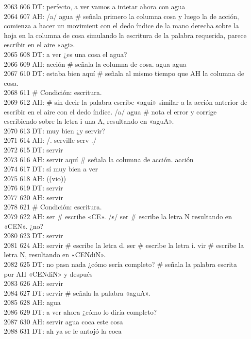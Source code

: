 2063 606 DT: perfecto, a ver vamos a intetar ahora con agua\\
2064 607 AH: /a/ agua # señala primero la columna cosa y luego la de acción, comienza a hacer un movimient con el dedo índice de la mano derecha sobre la hoja en la columna de cosa simulando la escritura de la palabra requerida, parece escribir en el aire «agi».\\
2065 608 DT: a ver ¿es una cosa el agua?\\
2066 609 AH: acción # señala la columna de cosa. agua agua\\
2067 610 DT: estaba bien aquí # señala al mismo tiempo que AH la columna de cosa.\\
2068 611 # Condición: escritura.\\
2069 612 AH: # sin decir la palabra escribe «agui» similar a la acción anterior de escribir en el aire con el dedo índice. /a/ agua # nota el error y corrige escribiendo sobre la letra i una A, resultando en «aguA».\\
2070 613 DT: muy bien ¿y servir?\\
2071 614 AH: /. serville serv ./ \\
2072 615 DT: servir\\
2073 616 AH: servir aquí # señala la columna de acción. acción\\
2074 617 DT: sí muy bien a ver\\
2075 618 AH: ((vio))\\
2076 619 DT: servir\\
2077 620 AH: servir\\
2078 621 # Condición: escritura.\\
2079 622 AH: ser # escribe «CE». /s/ ser # escribe la letra N resultando en «CEN». ¿no?\\
2080 623 DT: servir\\
2081 624 AH: servir # escribe la letra d. ser # escribe la letra i. vir # escribe la letra N, resultando en «CENdiN».\\
2082 625 DT: no pasa nada ¿cómo sería completo? # señala la palabra escrita por AH «CENdiN» y después\\
2083 626 AH: servir\\
2084 627 DT: servir # señala la palabra «aguA».\\
2085 628 AH: agua\\
2086 629 DT: a ver ahora ¿cómo lo diría completo?\\
2087 630 AH: servir agua coca este cosa\\
2088 631 DT: ah ya se le antojó la coca\\
